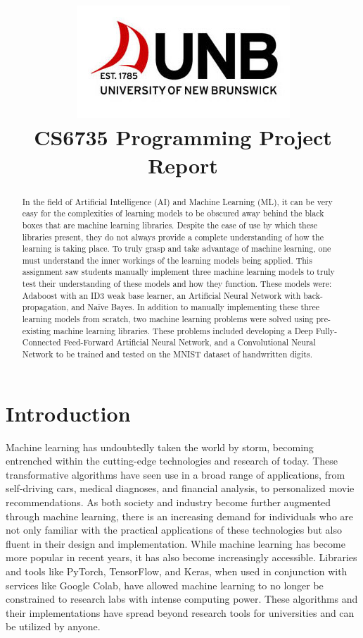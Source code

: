 \documentclass[a4paper]{article}
\title{\includegraphics[scale=0.75]{images/unblogo.jpg}\\CS6735 Programming Project Report}
\begin{document}
\maketitle

\begin{abstract}
    In the field of Artificial Intelligence (AI) and Machine Learning (ML), it can be very easy for the complexities of learning models to be obscured away behind the black boxes that are machine learning libraries. Despite the ease of use by which these libraries present, they do not always provide a complete understanding of how the learning is taking place. To truly grasp and take advantage of machine learning, one must understand the inner workings of the learning models being applied. This assignment saw students manually implement three machine learning models to truly test their understanding of these models and how they function. These models were: Adaboost with an ID3 weak base learner, an Artificial Neural Network with back-propagation, and Naïve Bayes. In addition to manually implementing these three learning models from scratch, two machine learning problems were solved using pre-existing machine learning libraries. These problems included developing a Deep Fully-Connected Feed-Forward Artificial Neural Network, and a Convolutional Neural Network to be trained and tested on the MNIST dataset of handwritten digits.
\end{abstract}

\newpage

\section{Introduction}

Machine learning has undoubtedly taken the world by storm, becoming entrenched within the cutting-edge technologies and research of today. These transformative algorithms have seen use in a broad range of applications, from self-driving cars, medical diagnoses, and financial analysis, to personalized movie recommendations. As both society and industry become further augmented through machine learning, there is an increasing demand for individuals who are not only familiar with the practical applications of these technologies but also fluent in their design and implementation. While machine learning has become more popular in recent years, it has also become increasingly accessible. Libraries and tools like PyTorch, TensorFlow, and Keras, when used in conjunction with services like Google Colab, have allowed machine learning to no longer be constrained to research labs with intense computing power. These algorithms and their implementations have spread beyond research tools for universities and can be utilized by anyone. 
\end{document}
